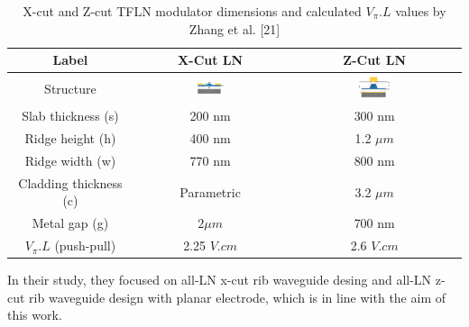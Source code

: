    \begin{table}[h!]
        \centering
        \caption{X-cut and Z-cut TFLN modulator dimensions and calculated $V_{\pi}.L$ values by Zhang et al. [21]}
        \begin{tabular}{|c|c|c|}
            \hline
            \textbf{Label} & \textbf{X-Cut LN} & \textbf{Z-Cut LN} \\
            \hline
            Structure & \includegraphics[width=0.2\textwidth]{x-cut-paper.PNG} & \includegraphics[width=0.2\textwidth]{z-cut-paper.PNG} \\
            \hline
            Slab thickness (s)  & 200 nm & 300 nm \\
            \hline
            Ridge height (h) & 400 nm & 1.2 $\mu m$ \\ 
            \hline
            Ridge width (w)& 770 nm & 800 nm\\
            \hline
            Cladding thickness (c)&  Parametric & 3.2 $\mu m$ \\
            \hline
            Metal gap (g) & $ 2\mu m$ & 700 nm\\
            \hline
            $V_{\pi}.L$ (push-pull) & 2.25 $V.cm$ & 2.6 $V.cm$\\
            \hline
        \end{tabular}
        \label{table:zhang-et-al}
    \end{table}

    In their study, they focused on all-LN x-cut rib waveguide desing and all-LN z-cut rib waveguide design with planar electrode, which is in line with the aim of this work.  

   
        

